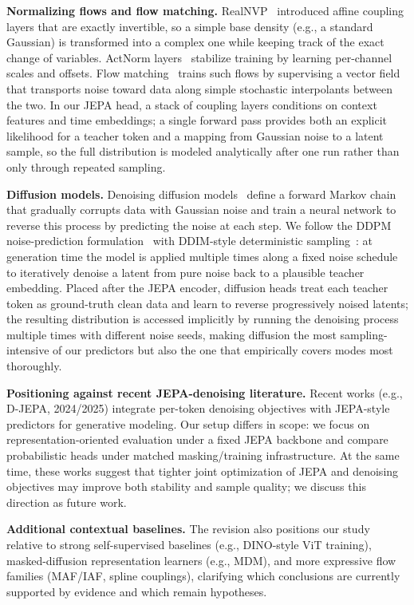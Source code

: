 \documentclass[conference]{IEEEtran}
\begin{document}
\textbf{Normalizing flows and flow matching.}
RealNVP~\cite{dinh2017realnvp} introduced affine coupling layers that are exactly invertible, so a simple base density (e.g., a standard Gaussian) is transformed into a complex one while keeping track of the exact change of variables.
ActNorm layers~\cite{kingma2018glow} stabilize training by learning per-channel scales and offsets.
Flow matching~\cite{lipman2023flowmatching} trains such flows by supervising a vector field that transports noise toward data along simple stochastic interpolants between the two.
In our JEPA head, a stack of coupling layers conditions on context features and time embeddings; a single forward pass provides both an explicit likelihood for a teacher token and a mapping from Gaussian noise to a latent sample, so the full distribution is modeled analytically after one run rather than only through repeated sampling.

\textbf{Diffusion models.}
Denoising diffusion models~\cite{ho2020ddpm,song2021ddim} define a forward Markov chain that gradually corrupts data with Gaussian noise and train a neural network to reverse this process by predicting the noise at each step.
We follow the DDPM noise-prediction formulation~\cite{ho2020ddpm} with DDIM-style deterministic sampling~\cite{song2021ddim}: at generation time the model is applied multiple times along a fixed noise schedule to iteratively denoise a latent from pure noise back to a plausible teacher embedding.
Placed after the JEPA encoder, diffusion heads treat each teacher token as ground-truth clean data and learn to reverse progressively noised latents; the resulting distribution is accessed implicitly by running the denoising process multiple times with different noise seeds, making diffusion the most sampling-intensive of our predictors but also the one that empirically covers modes most thoroughly.

\textbf{Positioning against recent JEPA-denoising literature.}
Recent works (e.g., D-JEPA, 2024/2025) integrate per-token denoising objectives with JEPA-style predictors for generative modeling.
Our setup differs in scope: we focus on representation-oriented evaluation under a fixed JEPA backbone and compare probabilistic heads under matched masking/training infrastructure.
At the same time, these works suggest that tighter joint optimization of JEPA and denoising objectives may improve both stability and sample quality; we discuss this direction as future work.

\textbf{Additional contextual baselines.}
The revision also positions our study relative to strong self-supervised baselines (e.g., DINO-style ViT training), masked-diffusion representation learners (e.g., MDM), and more expressive flow families (MAF/IAF, spline couplings), clarifying which conclusions are currently supported by evidence and which remain hypotheses.
\end{document}
